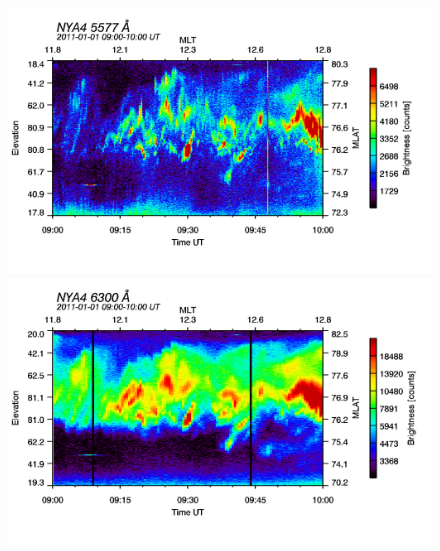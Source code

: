 \begin{figure}
\begin{minipage}{0.49\textwidth}
\includegraphics[width=1\linewidth]{Figures/Allsky/5577/nya4_20110101_0900_1000_5577_cal.png}
\end{minipage}
\begin{minipage}{0.49\textwidth}
\includegraphics[width=1\linewidth]{Figures/Allsky/6300/nya4_20110101_0900_1000_6300_cal.png}
\end{minipage}


\end{figure}
